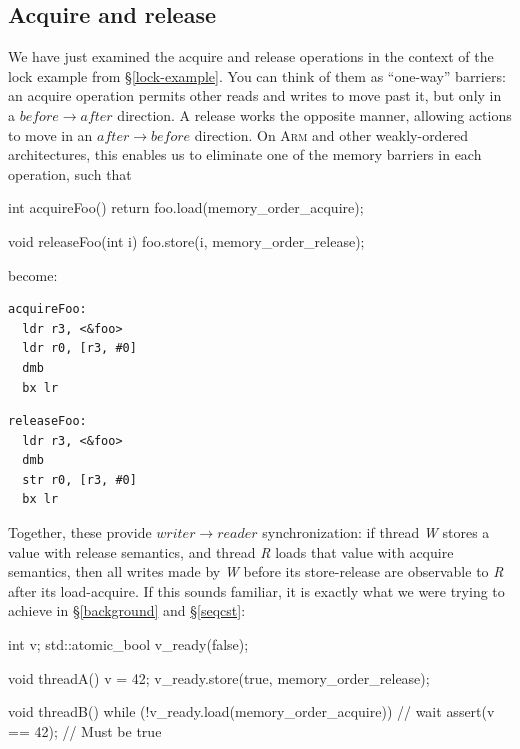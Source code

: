 \documentclass[fontsize=10pt, oneside]{scrartcl}
\newcommand{\secref}[1]{\hyperref[#1]{\textsc{\S}\ref*{#1}}}
\begin{document}
\subsection{Acquire and release}

We have just examined the acquire and release operations in the context of the lock example from \secref{lock-example}.
You can think of them as ``one-way'' barriers: an acquire operation permits other reads and writes to move past it,
but only in a $before \to after$ direction.
A release works the opposite manner, allowing actions to move in an $after \to before$ direction.
On \textsc{Arm} and other weakly-ordered architectures, this enables us to eliminate one of the memory barriers in each operation,
such that

\begin{cppcode}
int acquireFoo()
{
    return foo.load(memory_order_acquire);
}

void releaseFoo(int i)
{
    foo.store(i, memory_order_release);
}
\end{cppcode}
become:
\begin{minipage}{0.45\linewidth}
\begin{lstlisting}[language={[ARM]Assembler}]
acquireFoo:
  ldr r3, <&foo>
  ldr r0, [r3, #0]
  dmb
  bx lr
\end{lstlisting}
\end{minipage}
\begin{minipage}{0.45\linewidth}
\begin{lstlisting}[language={[ARM]Assembler}]
releaseFoo:
  ldr r3, <&foo>
  dmb
  str r0, [r3, #0]
  bx lr
\end{lstlisting}
\end{minipage}

Together, these provide $writer \to reader$ synchronization:
if thread \textit{W} stores a value with release semantics,
and thread \textit{R} loads that value with acquire semantics,
then all writes made by \textit{W} before its store-release are observable to \textit{R} after its load-acquire.
If this sounds familiar, it is exactly what we were trying to achieve in
\secref{background} and \secref{seqcst}:
\begin{cppcode}
int v;
std::atomic_bool v_ready(false);

void threadA()
{
    v = 42;
    v_ready.store(true, memory_order_release);
}

void threadB()
{
    while (!v_ready.load(memory_order_acquire)) {
        // wait
    }
    assert(v == 42); // Must be true
}
\end{cppcode}
\end{document}
